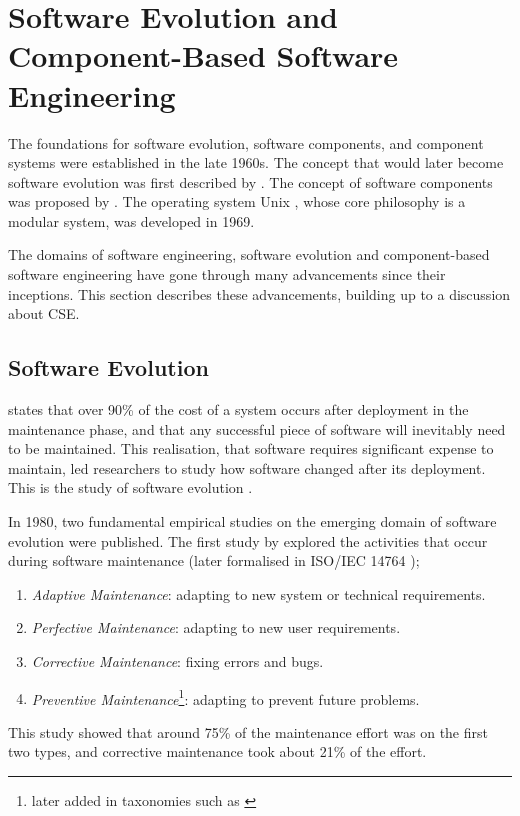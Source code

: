 \section{Software Evolution and Component-Based Software Engineering}
\label{background.histories}
The foundations for software evolution, software components, and component systems were established in the late 1960s.
The concept that would later become software evolution was first described by \cite{Lehman1969}.
The concept of software components was proposed by \cite{McIlroy1969}.
The operating system Unix \citep{raymond2003art}, whose core philosophy is a modular system, was developed in 1969.

The domains of software engineering, software evolution and component-based software engineering have gone through many advancements since their inceptions.
This section describes these advancements, building up to a discussion about CSE.

\subsection{Software Evolution}
\cite{Brooks1975} states that over 90\% of the cost of a system occurs after deployment in the maintenance phase,
and that any successful piece of software will inevitably need to be maintained.
This realisation, that software requires significant expense to maintain, led researchers to study how software changed after its deployment.
This is the study of software evolution \citep{lehman1980}.

In 1980, two fundamental empirical studies on the emerging domain of software evolution were published.
The first study by \cite{Lientz1980} explored the activities that occur during software maintenance (later formalised in ISO/IEC 14764 \citep{IsoIec2006});
\begin{enumerate}
	\item \textit{Adaptive Maintenance}: adapting to new system or technical requirements.
	\item \textit{Perfective Maintenance}: adapting to new user requirements.
	\item \textit{Corrective Maintenance}: fixing errors and bugs.
	\item \textit{Preventive Maintenance}\footnote{later added in taxonomies such as \citep{iee1990ieee}}: adapting to prevent future problems.
\end{enumerate}

This study showed that around 75\% of the maintenance effort was on the first two types, and corrective maintenance took about 21\% of the effort.

